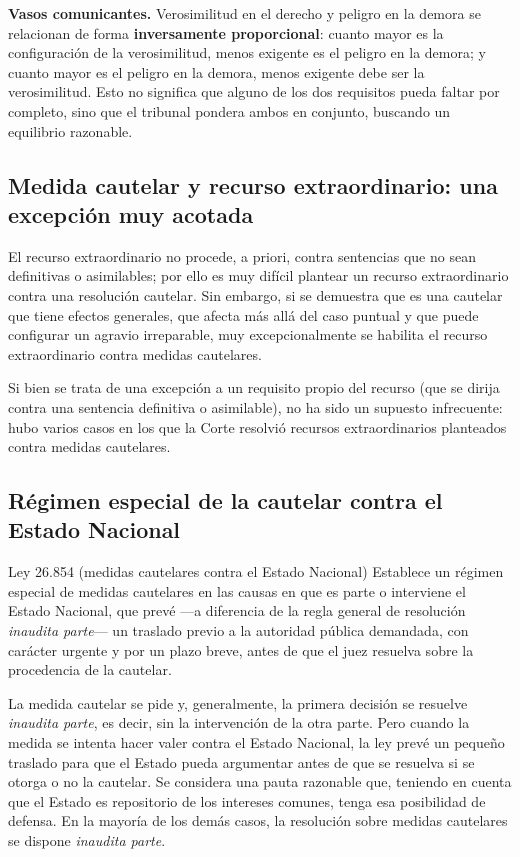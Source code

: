 \documentclass[12pt,oneside]{book}
\begin{document}
\begin{important}
\textbf{Vasos comunicantes.} Verosimilitud en el derecho y peligro en la demora se relacionan de forma \textbf{inversamente proporcional}: cuanto mayor es la configuración de la verosimilitud, menos exigente es el peligro en la demora; y cuanto mayor es el peligro en la demora, menos exigente debe ser la verosimilitud. Esto no significa que alguno de los dos requisitos pueda faltar por completo, sino que el tribunal pondera ambos en conjunto, buscando un equilibrio razonable.
\end{important}

\subsection{Medida cautelar y recurso extraordinario: una excepción muy acotada}

El recurso extraordinario no procede, a priori, contra sentencias que no sean definitivas o asimilables; por ello es muy difícil plantear un recurso extraordinario contra una resolución cautelar. Sin embargo, si se demuestra que es una cautelar que tiene efectos generales, que afecta más allá del caso puntual y que puede configurar un agravio irreparable, muy excepcionalmente se habilita el recurso extraordinario contra medidas cautelares.

Si bien se trata de una excepción a un requisito propio del recurso (que se dirija contra una sentencia definitiva o asimilable), no ha sido un supuesto infrecuente: hubo varios casos en los que la Corte resolvió recursos extraordinarios planteados contra medidas cautelares.

\subsection{Régimen especial de la cautelar contra el Estado Nacional}

\begin{norma}{Ley 26.854 (medidas cautelares contra el Estado Nacional)}
Establece un régimen especial de medidas cautelares en las causas en que es parte o interviene el Estado Nacional, que prevé —a diferencia de la regla general de resolución \textit{inaudita parte}— un traslado previo a la autoridad pública demandada, con carácter urgente y por un plazo breve, antes de que el juez resuelva sobre la procedencia de la cautelar.
\end{norma}

La medida cautelar se pide y, generalmente, la primera decisión se resuelve \textit{inaudita parte}, es decir, sin la intervención de la otra parte. Pero cuando la medida se intenta hacer valer contra el Estado Nacional, la ley prevé un pequeño traslado para que el Estado pueda argumentar antes de que se resuelva si se otorga o no la cautelar. Se considera una pauta razonable que, teniendo en cuenta que el Estado es repositorio de los intereses comunes, tenga esa posibilidad de defensa. En la mayoría de los demás casos, la resolución sobre medidas cautelares se dispone \textit{inaudita parte}.
\end{document}
